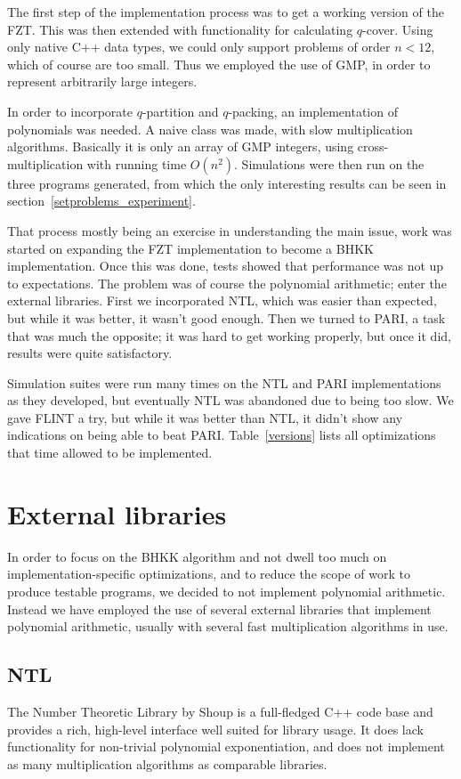 \documentclass{cslthse-msc}
\begin{document}
The first step of the implementation process was to get a working version of the FZT. This was then extended with functionality for calculating $q$-cover. Using only native C++ data types, we could only support problems of order $n < 12$, which of course are too small. Thus we employed the use of GMP, in order to represent arbitrarily large integers.

In order to incorporate $q$-partition and $q$-packing, an implementation of polynomials was needed. A naive class was made, with slow multiplication algorithms. Basically it is only an array of GMP integers, using cross-multiplication with running time $O(n^2)$. Simulations were then run on the three programs generated, from which the only interesting results can be seen in section~\ref{setproblems_experiment}.

That process mostly being an exercise in understanding the main issue, work was started on expanding the FZT implementation to become a BHKK implementation. Once this was done, tests showed that performance was not up to expectations. The problem was of course the polynomial arithmetic; enter the external libraries. First we incorporated NTL, which was easier than expected, but while it was better, it wasn't good enough. Then we turned to PARI, a task that was much the opposite; it was hard to get working properly, but once it did, results were quite satisfactory.

Simulation suites were run many times on the NTL and PARI implementations as they developed, but eventually NTL was abandoned due to being too slow. We gave FLINT a try, but while it was better than NTL, it didn't show any indications on being able to beat PARI. Table~\ref{versions} lists all optimizations that time allowed to be implemented.

\section{External libraries}
In order to focus on the BHKK algorithm and not dwell too much on implementation-specific optimizations, and to reduce the scope of work to produce testable programs, we decided to not implement polynomial arithmetic. Instead we have employed the use of several external libraries that implement polynomial arithmetic, usually with several fast multiplication algorithms in use.

\subsection{NTL}
The Number Theoretic Library by Shoup \cite{ntl} is a full-fledged C++ code base and provides a rich, high-level interface well suited for library usage. It does lack functionality for non-trivial polynomial exponentiation, and does not implement as many multiplication algorithms as comparable libraries.
\end{document}
